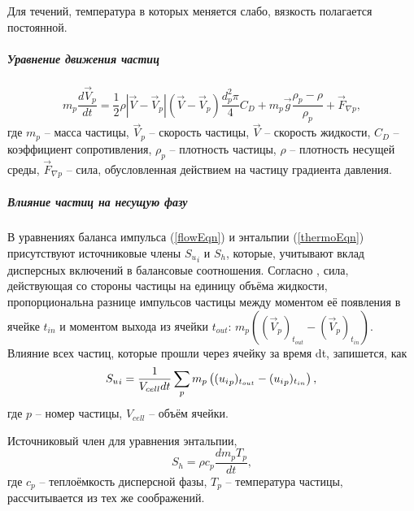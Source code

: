				Для течений, температура в которых меняется слабо, вязкость полагается постоянной.
		\subparagraph{Уравнение движения частиц}
			\begin{equation}
				m_p \frac{d \vec{V}_p}{dt} = \frac{1}{2}\rho |\vec{V}-\vec{V}_p|(\vec{V}-\vec{V}_p)\frac{d_p^2 \pi}{4}C_D + m_p \vec{g}\frac{\rho_p-\rho}{\rho_p} + \vec{F}_{\nabla{p}},		
			\end{equation}
			где $m_p$ -- масса частицы, $\vec{V}_p$ -- скорость частицы, $\vec{V}$ -- скорость жидкости, $C_D$ -- коэффициент сопротивления, $\rho_p$ -- плотность частицы, $\rho$ -- плотность несущей среды, $\vec{F}_{\nabla{p}}$ -- сила, обусловленная действием на частицу градиента давления.
		\subparagraph{Влияние частиц на несущую фазу\\}
		
		В уравнениях баланса импульса (\ref{flowEqn}) и энтальпии (\ref{thermoEqn}) присутствуют источниковые члены ${S_u}_i$ и $S_h$, которые, учитывают вклад дисперсных включений в балансовые соотношения. Согласно \cite{Vallier}, сила, действующая со стороны частицы на единицу объёма жидкости, пропорциональна разнице импульсов частицы между моментом её появления в ячейке $t_{in}$ и моментом выхода из ячейки $t_{out}$: $m_p\left( (\vec{V}_p)_{t_{out}} - (\vec{V}_p)_{t_{in}}\right)$. Влияние всех частиц, которые прошли через ячейку за время dt, запишется, как
		\begin{equation}
			{S_u}_i = \frac{1}{V_{cell}dt} \sum_p m_p \left( ({u_i}_p)_{t_{out}} - ({u_i}_p)_{t_{in}}\right),\\
		\end{equation}
		где $p$ -- номер частицы, $V_{cell}$ -- объём ячейки.
		
		Источниковый член для уравнения энтальпии,
		\begin{equation}
			S_h = \rho c_p \frac{d m_p T_p}{dt},
		\end{equation}
		где $c_p$ -- теплоёмкость дисперсной фазы, $T_p$ -- температура частицы, рассчитывается из тех же соображений.
